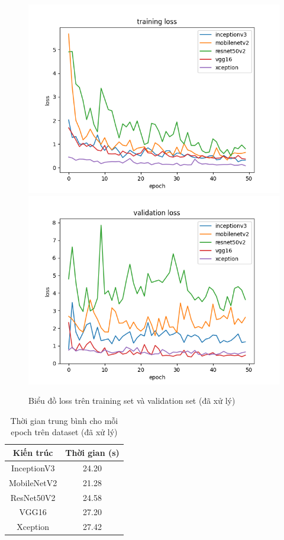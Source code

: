 \documentclass[a4paper,14pt]{extarticle}
\begin{document}
		\begin{figure}[H]
			\centering
			\includegraphics[scale=0.45]{images/loss.png}
			\includegraphics[scale=0.45]{images/val_loss.png}
			\caption{Biểu đồ loss trên training set và validation set (đã xử lý)}
		\end{figure}

		\begin{table}[H]
			\centering
			\begin{tabular}{|c|c|}
			\hline
			Kiến trúc   & Thời gian (s) \\ \hline
			InceptionV3 & 24.20         \\
			MobileNetV2 & 21.28         \\
			ResNet50V2  & 24.58         \\
			VGG16       & 27.20         \\
			Xception    & 27.42         \\ \hline
			\end{tabular}
			\caption{Thời gian trung bình cho mỗi epoch trên dataset (đã xử lý)}
		\end{table}
		
\end{document}
